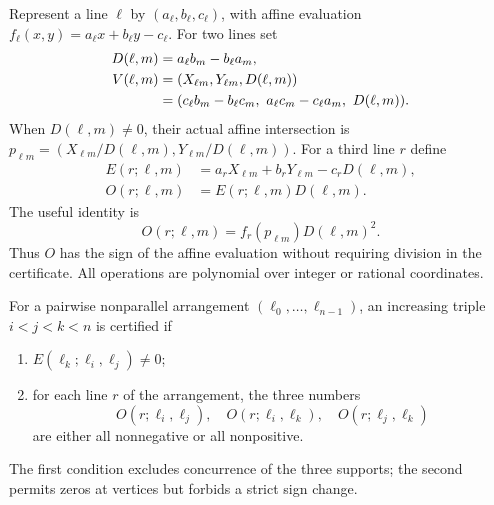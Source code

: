 Represent a line $\ell$ by $(a_\ell,b_\ell,c_\ell)$, with affine evaluation $f_\ell(x,y)=a_\ell x+b_\ell y-c_\ell$. For two lines set
\begin{align}
D(\ell,m)&=a_\ell b_m-b_\ell a_m,\label{eq:det}\\
V(\ell,m)&=(X_{\ell m},Y_{\ell m},D(\ell,m))\\
&=(c_\ell b_m-b_\ell c_m,\ a_\ell c_m-c_\ell a_m,\ D(\ell,m)).\notag
\end{align}
When $D(\ell,m)\ne0$, their actual affine intersection is
$p_{\ell m}=(X_{\ell m}/D(\ell,m),Y_{\ell m}/D(\ell,m))$. For a third line $r$ define
\begin{align}
E(r;\ell,m)&=a_rX_{\ell m}+b_rY_{\ell m}-c_rD(\ell,m),\\
O(r;\ell,m)&=E(r;\ell,m)D(\ell,m).
\end{align}
The useful identity is
\begin{equation}\label{eq:oriented-affine}
O(r;\ell,m)=f_r(p_{\ell m})D(\ell,m)^2.
\end{equation}
Thus $O$ has the sign of the affine evaluation without requiring division in the certificate. All operations are polynomial over integer or rational coordinates.

\begin{definition}\label{def:certificate}
For a pairwise nonparallel arrangement $(\ell_0,\ldots,\ell_{n-1})$, an increasing triple $i<j<k<n$ is certified if
\begin{enumerate}
\item $E(\ell_k;\ell_i,\ell_j)\ne0$;
\item for each line $r$ of the arrangement, the three numbers
\[
O(r;\ell_i,\ell_j),\quad O(r;\ell_i,\ell_k),\quad O(r;\ell_j,\ell_k)
\]
are either all nonnegative or all nonpositive.
\end{enumerate}
The first condition excludes concurrence of the three supports; the second permits zeros at vertices but forbids a strict sign change.
\end{definition}

